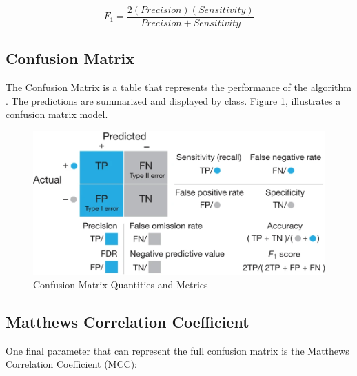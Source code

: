 \documentclass[10pt,conference,a4paper]{IEEEtran}
\begin{document}
\begin{equation}
    F_1 =  \frac{2(Precision)(Sensitivity)}{Precision + Sensitivity}
    \label{F1}
\end{equation}

\subsection{Confusion Matrix}

The Confusion Matrix is a table that represents the performance of the algorithm \cite{Lever2016}. The predictions are summarized and displayed by class. Figure \ref{fig:confusion_matrix}, illustrates a confusion matrix model.  

\begin{figure}[H]
    \centering
    \includegraphics[width=0.9\columnwidth]{confusion_matrix.png}
    \caption{Confusion Matrix Quantities and Metrics \cite{Lever2016}}
    \label{fig:confusion_matrix}
\end{figure}





\subsection{Matthews Correlation Coefficient}

One final parameter that can represent the full confusion matrix is the Matthews Correlation Coefficient (MCC):
\end{document}
